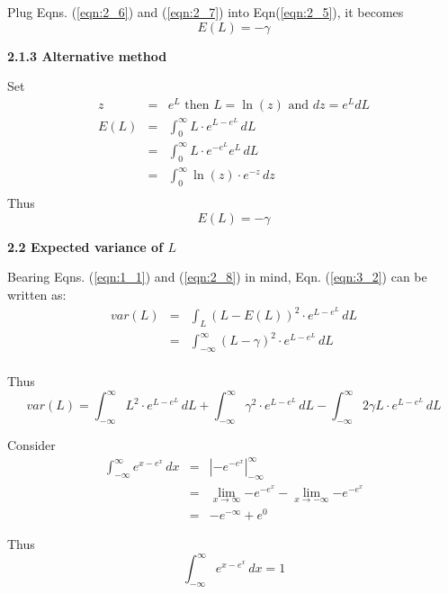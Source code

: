 \documentclass{beamer}
\begin{document}
Plug Eqns. (\ref{eqn:2_6}) and (\ref{eqn:2_7}) into Eqn(\ref{eqn:2_5}), it becomes
\begin{equation}
\label{eqn:2_8}
E(L) = - \gamma
\end{equation}

\textbf{2.1.3 Alternative method}

Set
\begin{eqnarray*} 
 z &=& e^L \text{ then } L = \ln(z) \text{ and } dz = e^L dL \\
E(L) 
	&=& \int_{0}^{\infty} \! L \cdot e^{L-e^L} \, dL \\
	&=& \int_{0}^{\infty} \! L \cdot e^{-e^L} e^L \, dL \\
	&=& \int_{0}^{\infty} \! \ln(z) \cdot e^{-z}  \, dz \\
\end{eqnarray*}
Thus
\begin{equation}
\label{eqn:2_9}
E(L) = - \gamma
\end{equation}


\textbf{2.2 Expected variance of $L$}

Bearing Eqns. (\ref{eqn:1_1}) and (\ref{eqn:2_8}) in mind, Eqn. (\ref{eqn:3_2}) can be written as:
\begin{eqnarray*}
 var(L) 
	&=& \int_L \! (L-E(L))^2 \cdot e^{L-e^L}  \, dL \\
	&=& \int_{-\infty}^{\infty} \! (L-\gamma)^2 \cdot e^{L-e^L}  \, dL \\
\end{eqnarray*}

Thus
\begin{equation}
\label{eqn:2_10}
var(L) 	= \int_{-\infty}^{\infty} \! L^2 \cdot e^{L-e^L}  \, dL  
		+ \int_{-\infty}^{\infty} \! \gamma^2 \cdot e^{L-e^L}  \, dL  
		- \int_{-\infty}^{\infty} \! 2 \gamma L \cdot e^{L-e^L}  \, dL  
\end{equation}

Consider 
\begin{eqnarray*}
\int_{-\infty}^{\infty} \! e^{x-e^x}  \, dx  
	&=& \left| -e^{-e^x} \right|_{-\infty}^{\infty} \\
	&=& \lim_{x \to \infty} {-e^{-e^x}} - \lim_{x \to -\infty} {-e^{-e^x}} \\
	&=& -e^{-\infty} + e^{0} 
\end{eqnarray*}

Thus
\begin{equation}
\label{eqn:2_11}
\int_{-\infty}^{\infty} \! e^{x-e^x}  \, dx  = 1
\end{equation}
\end{document}
